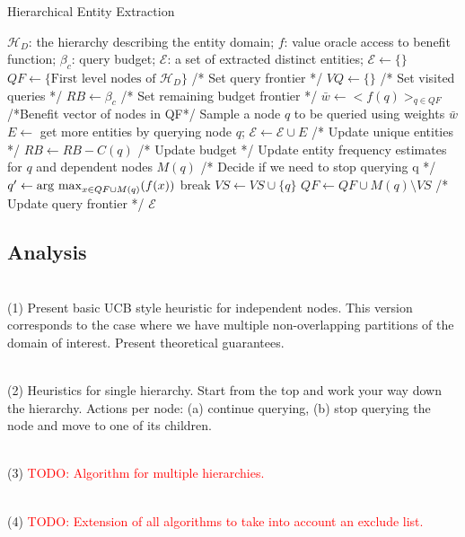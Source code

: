 \documentclass{vldb}
\newcommand{\argmax}{\operatornamewithlimits{arg\ max}}
\newcommand{\hierarchy}{\mathcal{H}_D}
\newcommand{\uentities}{\mathcal{E}}
\begin{document}
{
\small{
\begin{algorithm}[h]
\caption{Hierarchical Entity Extraction}
\begin{algorithmic}[1]
 $\hierarchy$: the hierarchy describing the entity domain; $f$: value oracle access to benefit function; $\beta_c$: query budget;
 $\uentities$: a set of extracted distinct entities;
\STATE $\uentities \leftarrow \{\}$
\STATE $QF \leftarrow \{\mbox{First level nodes of }\hierarchy\}$ /* Set query frontier */
\STATE $VQ \leftarrow \{\}$ /* Set visited queries */
\STATE $RB \leftarrow \beta_c$ /* Set remaining budget frontier */
	\STATE $\bar{w} \leftarrow <f(q)>_{q \in QF}$ /*Benefit vector of nodes in QF*/
	\STATE Sample a node $q$ to be queried using weights $\bar{w}$
		\STATE $E \leftarrow$ get more entities by querying node $q$; 
		\STATE $\uentities \leftarrow \uentities \cup E$ /* Update unique entities */
		\STATE $RB \leftarrow RB - C(q)$ /* Update budget */
		\STATE Update entity frequency estimates for $q$ and dependent nodes $M(q)$
		\STATE /* Decide if we need to stop querying q */
		\STATE $q^{\prime} \leftarrow \argmax_{x \in QF \cup M(q)} (f(x))$
			\STATE break
		\ENDIF
	\ENDWHILE
	\STATE $VS \leftarrow VS \cup \{q\}$
	\STATE $QF \leftarrow QF \cup M(q) \setminus VS$ /* Update query frontier */
\ENDWHILE
\RETURN $\uentities$
\end{algorithmic}
\end{algorithm}
}
}

\subsection{Analysis}
\ \\(1) Present basic UCB style heuristic for independent nodes. This version corresponds to the case where we have multiple non-overlapping partitions of the domain of interest. Present theoretical guarantees. 

\ \\(2) Heuristics for single hierarchy. Start from the top and work your way down the hierarchy. Actions per node: (a) continue querying, (b) stop querying the node and move to one of its children. 

\ \\(3) \textcolor{red}{TODO: Algorithm for multiple hierarchies.}

\ \\(4) \textcolor{red}{TODO: Extension of all algorithms to take into account an exclude list.}
\end{document}
